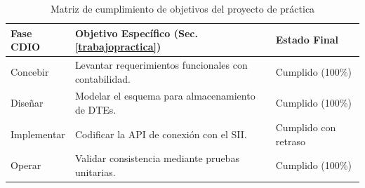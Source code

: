 \begin{table}[H]
	\centering
	\begin{tabular}{|p{}|p{}|p{}|}
		\hline
		\textbf{Fase CDIO} & \textbf{Objetivo Específico (Sec. \ref{trabajopractica})} & \textbf{Estado Final} \\ \hline
		Concebir & Levantar requerimientos funcionales con contabilidad. & Cumplido (100\%) \\ \hline
		Diseñar & Modelar el esquema para almacenamiento de DTEs. & Cumplido (100\%) \\ \hline
		Implementar & Codificar la API de conexión con el SII. & Cumplido con retraso \\ \hline
		Operar & Validar consistencia mediante pruebas unitarias. & Cumplido (100\%) \\ \hline
	\end{tabular}
		\caption{Matriz de cumplimiento de objetivos del proyecto de práctica}
	\label{tab:cumplimiento_objetivos}
\end{table}